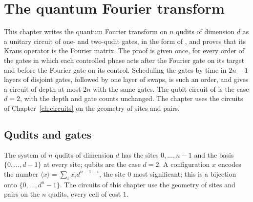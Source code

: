\chapter{The quantum Fourier transform}
\label{ch:qft}

This chapter writes the quantum Fourier transform on $n$ qudits of dimension $d$ as a
unitary circuit of one- and two-qudit gates, in the form of
\cite[Fig.~5.1]{NielsenChuang2010}, and proves that its Kraus operator is the Fourier
matrix. The proof is given once, for every order of the gates in which each controlled
phase acts after the Fourier gate on its target and before the Fourier gate on its
control. Scheduling the gates by time in $2n-1$ layers of disjoint gates, followed by
one layer of swaps, is such an order, and gives a circuit of depth at most $2n$ with
the same gates. The qubit circuit of \cite[Fig.~5.1]{NielsenChuang2010} is the case
$d=2$, with the depth and gate counts unchanged. The chapter uses the circuits of
Chapter~\ref{ch:circuits} on the geometry of sites and pairs.

\section{Qudits and gates}
\label{sec:qft_qubits}

\begin{definition}
    \label{def:qft_qubits}
    \leanok
    The system of $n$ qudits of dimension $d$ has the sites $0,\dots,n-1$ and the
    basis $\{0,\dots,d-1\}$ at every site; qubits are the case $d=2$. A configuration
    $x$ encodes the number $\langle x\rangle=\sum_ix_id^{n-1-i}$, the site $0$ most
    significant; this is a bijection onto $\{0,\dots,d^n-1\}$. The circuits of this
    chapter use the geometry of sites and pairs on the $n$ qudits, every cell of
    cost $1$.
\end{definition}

